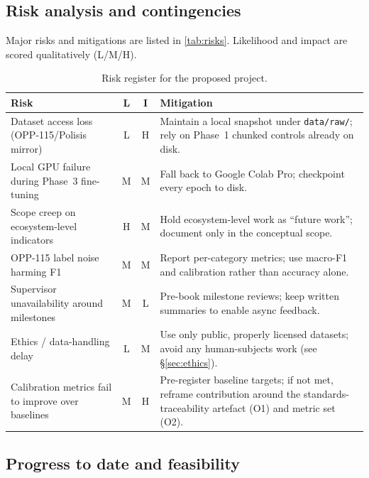 \documentclass[12pt,a4paper,titlepage]{article}
\let\orgautoref\autoref
\renewcommand{\autoref}[1]{\def\equationautorefname{Eq.}\orgautoref{#1}}
\begin{document}
\subsection{Risk analysis and contingencies}

Major risks and mitigations are listed in \autoref{tab:risks}. Likelihood and impact are scored qualitatively (L/M/H).

\begin{table}[hbt]
    \centering
    \caption{Risk register for the proposed project.}
    \label{tab:risks}
    \small
    \begin{tabularx}{\linewidth}{@{}l c c X@{}}
        \toprule
        \textbf{Risk} & \textbf{L} & \textbf{I} & \textbf{Mitigation} \\
        \midrule
        Dataset access loss (OPP-115/Polisis mirror) & L & H & Maintain a local snapshot under \texttt{data/raw/}; rely on Phase~1 chunked controls already on disk. \\
        Local GPU failure during Phase~3 fine-tuning & M & M & Fall back to Google Colab Pro; checkpoint every epoch to disk. \\
        Scope creep on ecosystem-level indicators & H & M & Hold ecosystem-level work as ``future work''; document only in the conceptual scope. \\
        OPP-115 label noise harming F1 & M & M & Report per-category metrics; use macro-F1 and calibration rather than accuracy alone. \\
        Supervisor unavailability around milestones & M & L & Pre-book milestone reviews; keep written summaries to enable async feedback. \\
        Ethics / data-handling delay & L & M & Use only public, properly licensed datasets; avoid any human-subjects work (see \S\ref{sec:ethics}). \\
        Calibration metrics fail to improve over baselines & M & H & Pre-register baseline targets; if not met, reframe contribution around the standards-traceability artefact (O1) and metric set (O2). \\
        \bottomrule
    \end{tabularx}
\end{table}

\subsection{Progress to date and feasibility}
\end{document}
